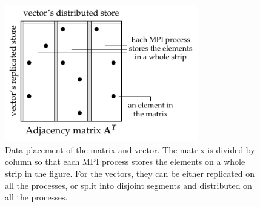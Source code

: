 \documentclass{sokendai_thesis} %
\newcommand{\boruvka}[0]{Boruvka}
\begin{document}
\begin{figure}
\includegraphics[width=0.75\textwidth]{figures/spmat.pdf}
\caption{Data placement of the matrix and vector.
The matrix is divided by column so that each MPI process stores the elements on a whole strip in the figure. For the vectors, they can be either replicated on all the processes, or split into disjoint segments and distributed on all the processes.}
\vspace{-8pt}
\label{fig:spmat}
\end{figure}

\end{document}
